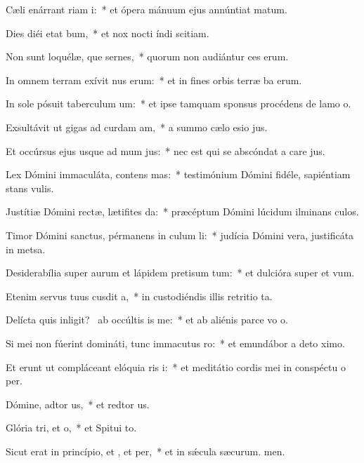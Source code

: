 \item Cæli enárrant riam i:~* et ópera mánuum ejus annúntiat matum.
\item Dies diéi etat bum,~* et nox nocti índi scitiam.
\item Non sunt loquélæ, que sernes,~* quorum non audiántur ces erum.
\item In omnem terram exívit nus erum:~* et in fines orbis terræ ba erum.
\item In sole pósuit taberculum um:~* et ipse tamquam sponsus procédens de lamo o.
\item Exsultávit ut gigas ad curdam am,~* a summo cælo esio jus.
\item Et occúrsus ejus usque ad mum jus:~* nec est qui se abscóndat a care jus.
\item Lex Dómini immaculáta, contens mas:~* testimónium Dómini fidéle, sapiéntiam stans vulis.
\item Justítiæ Dómini rectæ, lætifites da:~* præcéptum Dómini lúcidum ilminans culos.
\item Timor Dómini sanctus, pérmanens in culum li:~* judícia Dómini vera, justificáta in metsa.
\item Desiderabília super aurum et lápidem pretisum tum:~* et dulcióra super  et vum.
\item Etenim servus tuus cusdit a,~* in custodiéndis illis retritio ta.
\item Delícta quis inligit?~\pscross{} ab occúltis is  me:~* et ab aliénis parce vo o.
\item Si mei non fúerint domináti, tunc immacutus ro:~* et emundábor a deto ximo.
\item Et erunt ut compláceant elóquia ris i:~* et meditátio cordis mei in conspéctu o per.
\item Dómine, adtor us,~* et redtor us.
\item Glória tri, et o,~* et Spitui to.
\item Sicut erat in princípio, et , et per,~* et in sǽcula sæcurum. men.
